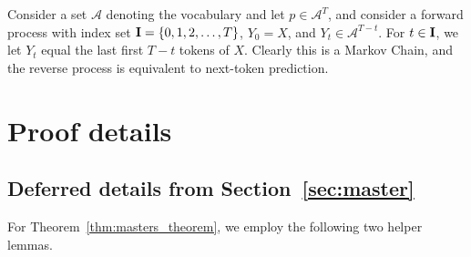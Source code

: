\begin{example}
Consider a set $\mathcal{A}$ denoting the vocabulary and let $p \in \mathcal{A}^T$, and consider a forward process with index set $\mathbf{I}=\{0,1,2,\dots,T\}$, $Y_0=X$, and $Y_t \in \mathcal{A}^{T-t}$. For $t \in \mathbf{I}$, we let $Y_t$ equal the last first $T-t$ tokens of $X$. Clearly this is a Markov Chain, and the reverse process is equivalent to next-token prediction.
\end{example}
\section{Proof details}
\subsection{Deferred details from Section~\ref{sec:master}}\label{app:master_details}
For Theorem~\ref{thm:masters_theorem}, we employ the following two helper lemmas. 

